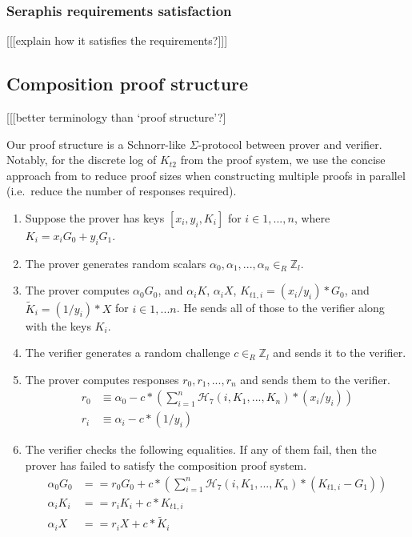 \begin{appendices}
\subsubsection{Seraphis requirements satisfaction}

[[[explain how it satisfies the requirements?]]]

\subsection{Composition proof structure}
\label{appendix:composition-proof-structure}

[[[better terminology than `proof structure'?]

Our proof structure is a Schnorr-like $\Sigma$-protocol between prover and verifier. Notably, for the discrete log of $K_{t2}$ from the proof system, we use the concise approach from \cite{clsag-eprint} to reduce proof sizes when constructing multiple proofs in parallel (i.e.\ reduce the number of responses required).

\begin{enumerate}
    \item Suppose the prover has keys $[x_i, y_i, K_i]$ for $i \in 1,...,n$, where $K_i = x_i G_0 + y_i G_1$.

    \item The prover generates random scalars $\alpha_0, \alpha_1, ..., \alpha_n \in_R \mathbb{Z}_l$.

    \item The prover computes $\alpha_0 G_0$, and $\alpha_i K$, $\alpha_i X$, $K_{t1,i} = (x_i/y_i)*G_0$, and $\tilde{K}_i = (1/y_i)*X$ for $i \in 1,...n$. He sends all of those to the verifier along with the keys $K_i$.

    \item The verifier generates a random challenge $c \in_R \mathbb{Z}_l$ and sends it to the verifier.

    \item The prover computes responses $r_0, r_1, ..., r_n$ and sends them to the verifier.\vspace{.115cm}
    \begin{align*}
        r_0 &\equiv \alpha_0 - c*(\sum^n_{i=1} \mathcal{H}_7(i, K_1,...,K_n)*(x_i/y_i)) \\
        r_i &\equiv \alpha_i - c*(1/y_i)
    \end{align*}

    \item The verifier checks the following equalities. If any of them fail, then the prover has failed to satisfy the composition proof system.\vspace{.115cm}
    \begin{align*}
        \alpha_0 G_0 &== r_0 G_0 + c*(\sum^n_{i=1} \mathcal{H}_7(i, K_1,...,K_n)*(K_{t1,i} - G_1)) \\
        \alpha_i K_i &== r_i K_i + c*K_{t1,i} \\
        \alpha_i X   &== r_i X + c*\tilde{K}_i
    \end{align*}
\end{enumerate}



\end{appendices}
